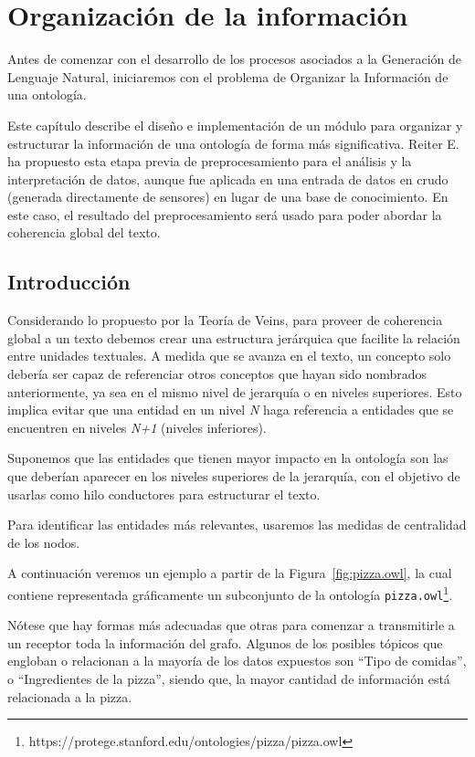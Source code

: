 \chapter{Organización de la información}

Antes de comenzar con el desarrollo de los procesos asociados a la Generación de Lenguaje Natural, iniciaremos con el problema de Organizar la Información de una ontología.  

Este capítulo describe el diseño e implementación de un módulo para organizar y estructurar la información de una ontología de forma más significativa. Reiter E.~\cite{reiter2007architecture} ha propuesto esta etapa previa de preprocesamiento para el análisis y la interpretación de datos, aunque fue aplicada en una entrada de datos en crudo (generada directamente de sensores) en lugar de una base de conocimiento. En este caso, el resultado del preprocesamiento será usado para poder abordar la coherencia global del texto.

\section{Introducción}
Considerando lo propuesto por la Teoría de Veins, para proveer de coherencia global a un texto debemos crear una estructura jerárquica que facilite la relación entre unidades textuales. A medida que se avanza en el texto, un concepto solo debería ser capaz de referenciar otros conceptos que hayan sido nombrados anteriormente, ya sea en el mismo nivel de jerarquía o en niveles superiores. Esto implica evitar que una entidad en un nivel \emph{N} haga referencia a entidades que se encuentren en niveles \emph{N+1} (niveles inferiores). 

Suponemos que las entidades que tienen mayor impacto en la ontología son las que deberían aparecer en los niveles superiores de la jerarquía, con el objetivo de usarlas como hilo conductores para estructurar el texto. 

Para identificar las entidades más relevantes, usaremos las medidas de centralidad de los nodos.

A continuación veremos un ejemplo a partir de la Figura~\ref{fig:pizza.owl}, la cual contiene representada gráficamente un subconjunto de la ontología {\tt pizza.owl}\footnote{https://protege.stanford.edu/ontologies/pizza/pizza.owl}.

Nótese que hay formas más adecuadas que otras para comenzar a transmitirle a un receptor toda la información del grafo. Algunos de los posibles tópicos que engloban o relacionan a la mayoría de los datos expuestos son ``Tipo de comidas'', o ``Ingredientes de la pizza'', siendo que, la mayor cantidad de información está relacionada a la pizza. 

